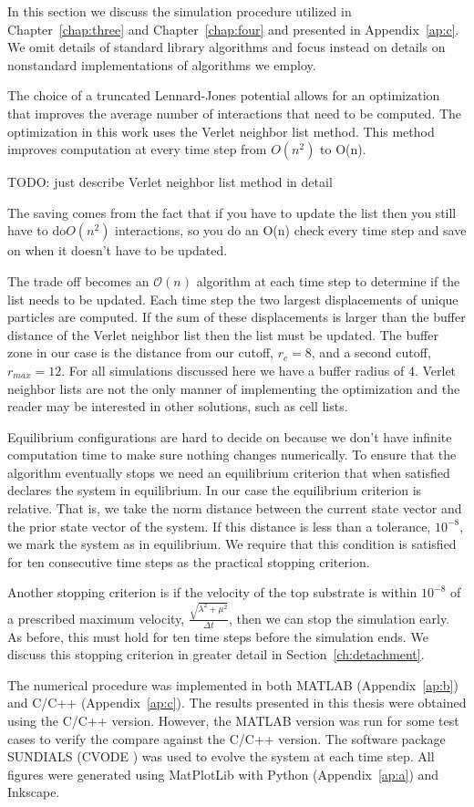   In this section we discuss the simulation procedure utilized in Chapter~\ref{chap:three} and Chapter~\ref{chap:four} and presented in Appendix~\ref{ap:c}. We omit details of standard library algorithms and focus instead on details on nonstandard implementations of algorithms we employ.

   The choice of a truncated Lennard-Jones potential allows for an optimization that improves the average number of interactions that need to be computed. The optimization in this work uses the Verlet neighbor list method. This method improves computation at every time step from $O(n^2)$ to O(n). 
   
   TODO: just describe Verlet neighbor list method in detail
   
   The saving comes from the fact that if you have to update the list then you still have to do$ O(n^2)$ interactions, so you do an O(n) check every time step and save on when it doesn't have to be updated.
   
   
   The trade off becomes an $\mathcal{O}(n)$ algorithm at each time step to determine if the list needs to be updated. Each time step the two largest displacements of unique particles are computed. If the sum of these displacements is larger than the buffer distance of the Verlet neighbor list then the list must be updated. The buffer zone in our case is the distance from our cutoff, $r_c = 8$, and a second cutoff, $r_{max} = 12$. For all simulations discussed here we have a buffer radius of $4$. Verlet neighbor lists are not the only manner of implementing the optimization and the reader may be interested in other solutions, such as cell lists.

   Equilibrium configurations are hard to decide on because we don't have infinite computation time to make sure nothing changes numerically. To ensure that the algorithm eventually stops we need an equilibrium criterion that when satisfied declares the system in equilibrium. In our case the equilibrium criterion is relative. That is, we take the norm distance between the current state vector and the prior state vector of the system. If this distance is less than a tolerance, $10^{-8}$, we mark the system as in equilibrium. We require that this condition is satisfied for ten consecutive time steps as the practical stopping criterion.
   
   Another stopping criterion is if the velocity of the top substrate is within $10^{-8}$ of a prescribed maximum velocity, $\frac{\sqrt{\lambda^2 + \mu^2}}{\Delta t}$, then we can stop the simulation early. As before, this must hold for ten time steps before the simulation ends. We discuss this stopping criterion in greater detail in Section~\ref{ch:detachment}.
   
   The numerical procedure was implemented in both MATLAB \cite{MATLAB2010} (Appendix~\ref{ap:b}) and C/C++ (Appendix~\ref{ap:c}). The results presented in this thesis were obtained using the C/C++ version. However, the MATLAB version was run for some test cases to verify the compare against the C/C++ version. The software package SUNDIALS (CVODE \cite{sundials}) was used to evolve the system at each time step. All figures were generated using MatPlotLib \cite{Hunter2007} with Python (Appendix~\ref{ap:a}) and Inkscape.
